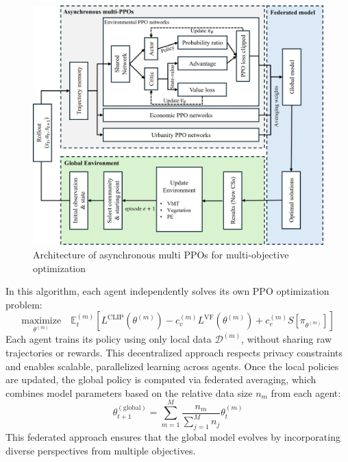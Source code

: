 \documentclass[preprint,12pt]{elsarticle}
\begin{document}
\begin{figure}[h]
    \centering
    \includegraphics[width=0.7\linewidth]{paper/doc/result_figure/asynchronous multi PPOs_v2.jpg}
    \caption{Architecture of asynchronous multi PPOs for multi-objective optimization}
    \label{fig:aoampfmoo}
\end{figure}
In this algorithm, each agent independently solves its own PPO optimization problem:
\begin{equation}
    \underset{\theta^{(m)}}{\text{maximize}} \quad 
\mathbb{E}_t^{(m)} \left[
L^{\text{CLIP}}(\theta^{(m)})
- c_v^{(m)} L^{\text{VF}}(\theta^{(m)})
+ c_e^{(m)} S[\pi_{\theta^{(m)}}]
\right]
\end{equation}
Each agent trains its policy using only local data $\mathcal{D}^{(m)}$, without sharing raw trajectories or rewards. This decentralized approach respects privacy constraints and enables scalable, parallelized learning across agents. Once the local policies are updated, the global policy is computed via federated averaging, which combines model parameters based on the relative data size $n_m$ from each agent:
\begin{equation}
    \theta^{(\text{global})}_{t+1} = \sum_{m=1}^{M} \frac{n_m}{\sum_{j=1}^{M} n_j} \theta^{(m)}_t
\end{equation}
This federated approach ensures that the global model evolves by incorporating diverse perspectives from multiple objectives.
\end{document}
